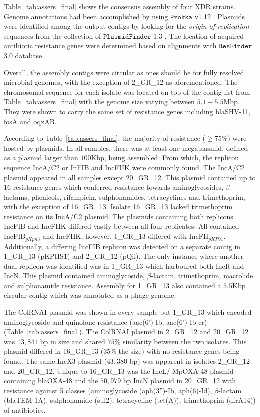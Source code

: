Table~\ref{tab:assers_final} shows the consensus assembly of four XDR \kp{} strains. 
Genome annotations had been accomplished by using $\mathtt{Prokka}$ v1.12 \cite{Seemann2014}. 
Plasmids were identified among the output contigs by looking for the \emph{origin of replication} sequences from the collection of $\mathtt{PlasmidFinder}$ 1.3 \cite{Carattoli2014}.
The location of acquired antibiotic resistance genes were determined based on alignments with $\mathtt{ResFinder}$ 3.0 \cite{ZankariHC2012} database. 

Overall, the assembly contigs were circular as ones should be for fully resolved microbial genomes, with the exception of 2\_GR\_12 as aforementioned. 
The chromosomal sequence for each isolate was located on top of the contig list from Table~\ref{tab:assers_final} with the genome size varying between $5.1-5.5$Mbp. They were shown to carry the same set of resistance genes including blaSHV-11, fosA and oqxAB. 


According to Table~\ref{tab:assers_final}, the majority of resistance ($\geq 75\%$) were hosted by plasmids.
In all samples, there was at least one megaplasmid, defined as a plasmid larger than $100$Kbp, being assembled. From which, the replicon sequence IncA/C2 or InFIB and IncFIIK were commonly found.
The IncA/C2 plasmid appeared in all samples except 20\_GR\_12. 
This plasmid contained up to 16 resistance genes which conferred resistance towards aminoglycosides, $\beta$-lactams, phenicols, rifampicin, sulphonamides, tetracyclines and trimethoprim, with the exception of 16\_GR\_13. Isolate 16\_GR\_13 lacked trimethoprim resistance on its IncA/C2 plasmid. 
The plasmids containing both replicons IncFIB and IncFIIK differed vastly between all four replicates. 
All contained IncFIB$_{pKpn3}$ and IncFIIK, however, 1\_GR\_13 differed with IncFII$_{pKP91}$. Additionally, a differing IncFIB replicon was detected on a separate contig in 1\_GR\_13 (pKPHS1) and 2\_GR\_12 (pQil). 
The only instance where another dual replicon was identified was in 1\_GR\_13 which harboured both IncR and IncN. 
This plasmid contained aminoglycoside, $\beta$-lactam, trimethoprim, macrolide and sulphonamide resistance. 
Assembly for 1\_GR\_13 also contained a $5.5$Kbp circular contig which was annotated as a phage genome.

The ColRNAI plasmid was shown in every sample but 1\_GR\_13 which encoded aminoglycoside and quinolone resistance (aac(6')-Ib, aac(6')-Ib-cr) (Table~\ref{tab:assers_final}).
The ColRNAI plasmid in 2\_GR\_12 and 20\_GR\_12 was $13,841$ bp in size and shared $75\%$ similarity between the two isolates. This plasmid differed in 16\_GR\_13 ($35\%$ the size) with no resistance genes being found. 
The same IncX3 plasmid ($43,380$ bp) was apparent in isolates 2\_GR\_12 and 20\_GR\_12.
Unique to 16\_GR\_13 was the IncL/ MpOXA-48 plasmid containing blaOXA-48 and the $50,979$ bp IncN plasmid in 20\_GR\_12 with resistance against 5 classes (aminoglycoside (aph(3'')-Ib, aph(6)-Id), $\beta$-lactam (blaTEM-1A), sulphonamide (sul2), tetracycline (tet(A)), trimethoprim (dfrA14)) of antibiotics.

